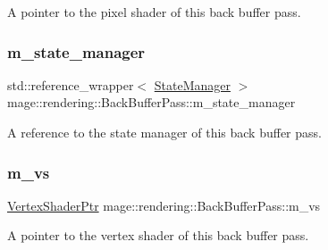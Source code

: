 A pointer to the pixel shader of this back buffer pass. \mbox{\label{classmage_1_1rendering_1_1_back_buffer_pass_a5d10a44c5f8a3529d64aabfb590156f2}} 
\subsubsection{\texorpdfstring{m\+\_\+state\+\_\+manager}{m\_state\_manager}}
{\footnotesize\ttfamily std\+::reference\+\_\+wrapper$<$ \mbox{\hyperlink{classmage_1_1rendering_1_1_state_manager}{State\+Manager}} $>$ mage\+::rendering\+::\+Back\+Buffer\+Pass\+::m\+\_\+state\+\_\+manager\hspace{0.3cm}{\ttfamily [private]}}

A reference to the state manager of this back buffer pass. \mbox{\label{classmage_1_1rendering_1_1_back_buffer_pass_a12a95cc800090a0bc01d14a9f5903748}} 
\subsubsection{\texorpdfstring{m\+\_\+vs}{m\_vs}}
{\footnotesize\ttfamily \mbox{\hyperlink{namespacemage_1_1rendering_aaf704b9c54a4181f4950a1761de69dda}{Vertex\+Shader\+Ptr}} mage\+::rendering\+::\+Back\+Buffer\+Pass\+::m\+\_\+vs\hspace{0.3cm}{\ttfamily [private]}}

A pointer to the vertex shader of this back buffer pass. 